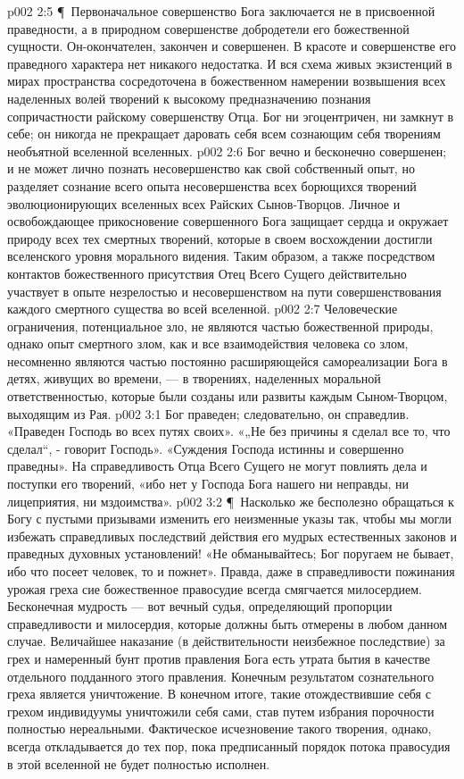 \vs p002 2:5 \P\ Первоначальное совершенство Бога заключается не в присвоенной праведности, а в природном совершенстве добродетели его божественной сущности. Он\hyp{}окончателен, закончен и совершенен. В красоте и совершенстве его праведного характера нет никакого недостатка. И вся схема живых экзистенций в мирах пространства сосредоточена в божественном намерении возвышения всех наделенных волей творений к высокому предназначению познания сопричастности райскому совершенству Отца. Бог ни эгоцентричен, ни замкнут в себе; он никогда не прекращает даровать себя всем сознающим себя творениям необъятной вселенной вселенных.
\vs p002 2:6 Бог вечно и бесконечно совершенен; и не может лично познать несовершенство как свой собственный опыт, но разделяет сознание всего опыта несовершенства всех борющихся творений эволюционирующих вселенных всех Райских Сынов\hyp{}Творцов. Личное и освобождающее прикосновение совершенного Бога защищает сердца и окружает природу всех тех смертных творений, которые в своем восхождении достигли вселенского уровня морального видения. Таким образом, а также посредством контактов божественного присутствия Отец Всего Сущего действительно участвует в опыте  незрелостью и несовершенством на пути совершенствования каждого смертного существа во всей вселенной.
\vs p002 2:7 Человеческие ограничения, потенциальное зло, не являются частью божественной природы, однако опыт смертного  злом, как и все взаимодействия человека со злом, несомненно являются частью постоянно расширяющейся самореализации Бога в детях, живущих во времени, --- в творениях, наделенных моральной ответственностью, которые были созданы или развиты каждым Сыном\hyp{}Творцом, выходящим из Рая.
\vs p002 3:1 Бог праведен; следовательно, он справедлив. «Праведен Господь во всех путях своих». «„Не без причины я сделал все то, что сделал“, \hyp{} говорит Господь». «Суждения Господа истинны и совершенно праведны». На справедливость Отца Всего Сущего не могут повлиять дела и поступки его творений, «ибо нет у Господа Бога нашего ни неправды, ни лицеприятия, ни мздоимства».
\vs p002 3:2 \P\ Насколько же бесполезно обращаться к Богу с пустыми призывами изменить его неизменные указы так, чтобы мы могли избежать справедливых последствий действия его мудрых естественных законов и праведных духовных установлений! «Не обманывайтесь; Бог поругаем не бывает, ибо что посеет человек, то и пожнет». Правда, даже в справедливости пожинания урожая греха сие божественное правосудие всегда смягчается милосердием. Бесконечная мудрость --- вот вечный судья, определяющий пропорции справедливости и милосердия, которые должны быть отмерены в любом данном случае. Величайшее наказание (в действительности неизбежное последствие) за грех и намеренный бунт против правления Бога есть утрата бытия в качестве отдельного подданного этого правления. Конечным результатом сознательного греха является уничтожение. В конечном итоге, такие отождествившие себя с грехом индивидуумы уничтожили себя сами, став путем избрания порочности полностью нереальными. Фактическое исчезновение такого творения, однако, всегда откладывается до тех пор, пока предписанный порядок потока правосудия в этой вселенной не будет полностью исполнен.
